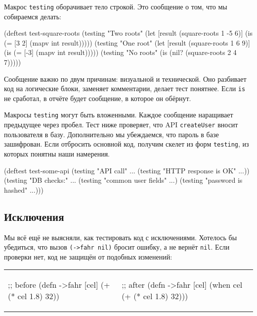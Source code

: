 
Макрос \verb|testing| оборачивает тело строкой. Это сообщение о том, что мы
собираемся делать:

\begin{english}
  \begin{clojure}
(deftest test-square-roots
  (testing "Two roots"
    (let [result (square-roots 1 -5 6)]
      (is (= [3 2] (mapv int result)))))
  (testing "One root"
    (let [result (square-roots 1 6 9)]
      (is (= [-3] (mapv int result)))))
  (testing "No roots"
    (is (nil? (square-roots 2 4 7)))))
  \end{clojure}
\end{english}

Сообщение важно по двум причинам: визуальной и технической. Оно разбивает код на
логические блоки, заменяет комментарии, делает тест понятнее. Если \verb|is|
не сработал, в отчёте будет сообщение, в которое он обёрнут.

Макросы \verb|testing| могут быть вложенными. Каждое сообщение наращивает
предыдущее через пробел. Тест ниже проверяет, что API \verb|createUser| вносит
пользователя в базу. Дополнительно мы убеждаемся, что пароль в базе
зашифрован. Если отбросить основной код, получим скелет из форм \verb|testing|,
из которых понятны наши намерения.

\begin{english}
  \begin{clojure}
(deftest test-some-api
  (testing "API call" ...
    (testing "HTTP response is OK" ...))
  (testing "DB checks:" ...
    (testing "common user fields" ...)
    (testing "password is hashed" ...)))
  \end{clojure}
\end{english}

\subsection{Исключения}


Мы всё ещё не выясняли, как тестировать код с исключениями. Хотелось бы
убедиться, что вызов \verb|(->fahr nil)| бросит ошибку, а не вернёт
\verb|nil|. Если проверки нет, код не защищён от подобных изменений:

\noindent
\begin{tabular}{ @{}p{5cm} @{}p{5cm} }

\begin{english}
  \begin{clojure}
;; before
(defn ->fahr [cel]
  (+ (* cel 1.8) 32))
  \end{clojure}
\end{english}

&

\begin{english}
  \begin{clojure}
;; after
(defn ->fahr [cel]
  (when cel
    (+ (* cel 1.8) 32)))
  \end{clojure}
\end{english}

\end{tabular}

